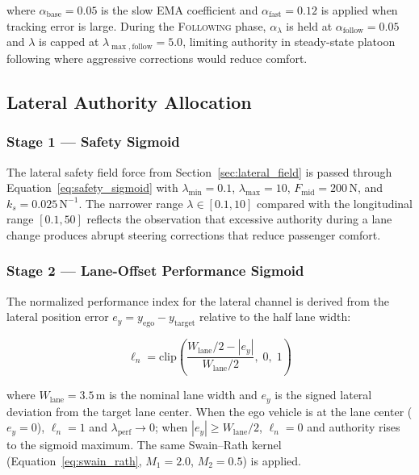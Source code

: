\documentclass[12pt,a4paper,oneside]{report}
\begin{document}
where $\alpha_{\mathrm{base}} = 0.05$ is the slow EMA coefficient and $\alpha_{\mathrm{fast}} = 0.12$ is applied when tracking error is large. During the \textsc{Following} phase, $\alpha_\lambda$ is held at $\alpha_{\mathrm{follow}} = 0.05$ and $\lambda$ is capped at $\lambda_{\max,\mathrm{follow}} = 5.0$, limiting authority in steady-state platoon following where aggressive corrections would reduce comfort.

\subsection{Lateral Authority Allocation}
\label{sec:lat_authority}

\subsubsection{Stage 1 — Safety Sigmoid}

The lateral safety field force from Section~\ref{sec:lateral_field} is passed through Equation~\ref{eq:safety_sigmoid} with $\lambda_{\min} = 0.1$, $\lambda_{\max} = 10$, $F_{\mathrm{mid}} = 200\,\mathrm{N}$, and $k_s = 0.025\,\mathrm{N}^{-1}$. The narrower range $\lambda \in [0.1, 10]$ compared with the longitudinal range $[0.1, 50]$ reflects the observation that excessive authority during a lane change produces abrupt steering corrections that reduce passenger comfort.

\subsubsection{Stage 2 — Lane-Offset Performance Sigmoid}

The normalized performance index for the lateral channel is derived from the lateral position error $e_y = y_{\mathrm{ego}} - y_{\mathrm{target}}$ relative to the half lane width:

\begin{equation}
\ell_n = \mathrm{clip}\!\left(\frac{W_{\mathrm{lane}}/2 - |e_y|}{W_{\mathrm{lane}}/2},\; 0,\; 1\right)
\label{eq:ln_lat}
\end{equation}

where $W_{\mathrm{lane}} = 3.5\,\mathrm{m}$ is the nominal lane width and $e_y$ is the signed lateral deviation from the target lane center. When the ego vehicle is at the lane center ($e_y = 0$), $\ell_n = 1$ and $\lambda_{\mathrm{perf}} \to 0$; when $|e_y| \geq W_{\mathrm{lane}}/2$, $\ell_n = 0$ and authority rises to the sigmoid maximum. The same Swain--Rath kernel (Equation~\ref{eq:swain_rath}, $M_1 = 2.0$, $M_2 = 0.5$) is applied.
\end{document}
